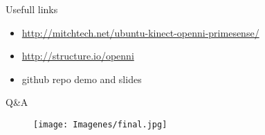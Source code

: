 \documentclass[bigger]{beamer}
\begin{document}
\begin{frame}{\ECFAugie Usefull links}
\begin{itemize}
	\item \url{http://mitchtech.net/ubuntu-kinect-openni-primesense/}
	\item \url{http://structure.io/openni}
	\item github repo demo and slides 
\end{itemize}
\end{frame}

\begin{frame}{\ECFAugie Q\&A}
\begin{figure}[h]
		\texttt{[image: Imagenes/final.jpg]}
\end{figure}
\end{frame}
\end{document}

